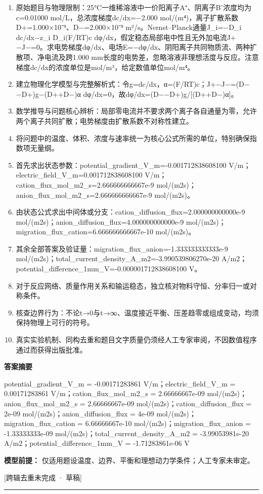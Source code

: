 \documentclass[UTF8,11pt,a4paper]{ctexart}
\begin{document}
\begin{enumerate}
\item 原始题目与物理限制：25°C一维稀溶液中一价阳离子A⁺、阴离子B⁻浓度均为c=0.01000 mol/L，总浓度梯度dc/dx=−2.000 mol/(m⁴)，离子扩散系数D+=1.000×10⁻⁹、D−=2.000×10⁻⁹ m²/s。Nernst–Planck通量J\_i=−D\_i dc/dx−z\_i D\_i(F/RT)c dφ/dx，假定稳态局部电中性且无外加电流J+−J−=0。求电势梯度dφ/dx、电场E=−dφ/dx、阴阳离子共同物质流、两种扩散项、净电流及跨1.000 mm长度的电势差，忽略溶液非理想活度与反应。注意梯度dc/dx的浓度单位是mol/m³，给定数值单位mol/m⁴。
\item 建立物理化学模型与完整解析式：令g=dc/dx，α=(F/RT)c；J+−J−=(D−−D+)g−(D++D−)α dφ/dx=0，故dφ/dx=(D−−D+)g/[(D++D−)α]。
\item 数学推导与问题核心辨析：局部零电流并不要求两个离子各自通量为零，允许两个离子共同扩散；电势梯度由扩散系数不对称性建立。
\item 将问题中的温度、体积、浓度与速率统一为核心公式所需的单位，特别确保指数项无量纲。
\item 首先求出状态参数：potential\_gradient\_V\_m=-0.001712838608100 V/m；electric\_field\_V\_m=0.001712838608100 V/m；cation\_flux\_mol\_m2\_s=2.666666666667e-9 mol/(m2s)；anion\_flux\_mol\_m2\_s=2.666666666667e-9 mol/(m2s)。
\item 由状态公式求出中间体或分支：cation\_diffusion\_flux=2.000000000000e-9 mol/(m2s)；anion\_diffusion\_flux=4.000000000000e-9 mol/(m2s)；migration\_flux\_cation=6.666666666667e-10 mol/(m2s)。
\item 其余全部答案及验证量：migration\_flux\_anion=-1.333333333333e-9 mol/(m2s)；total\_current\_density\_A\_m2=-3.990539806270e-20 A/m2；potential\_difference\_1mm\_V=-0.000001712838608100 V。
\item 对于反应网络、质量作用关系和输运稳态，独立核对物料守恒、分率归一或对称条件。
\item 核查边界行为：不论t→0与t→∞、温度接近平衡、压差趋零或组成变动，均须保持物理上可行的符号。
\item 真实实验机制、同构去重和题目文字质量仍须经人工专家审阅，不因数值程序通过而获得出版批准。
\end{enumerate}
\noindent\textbf{答案摘要}\par
potential\_gradient\_V\_m = -0.00171283861 V/m；electric\_field\_V\_m = 0.00171283861 V/m；cation\_flux\_mol\_m2\_s = 2.66666667e-09 mol/(m2s)；anion\_flux\_mol\_m2\_s = 2.66666667e-09 mol/(m2s)；cation\_diffusion\_flux = 2e-09 mol/(m2s)；anion\_diffusion\_flux = 4e-09 mol/(m2s)；migration\_flux\_cation = 6.66666667e-10 mol/(m2s)；migration\_flux\_anion = -1.33333333e-09 mol/(m2s)；total\_current\_density\_A\_m2 = -3.99053981e-20 A/m2；potential\_difference\_1mm\_V = -1.71283861e-06 V\par
\noindent\textbf{模型前提：}
仅适用题设温度、边界、平衡和理想动力学条件；人工专家未审定。\par
\noindent\textcolor{red!65!black}{[跨辑去重未完成 · 草稿]} \par
\medskip\hrule\medskip
{}
\end{document}
